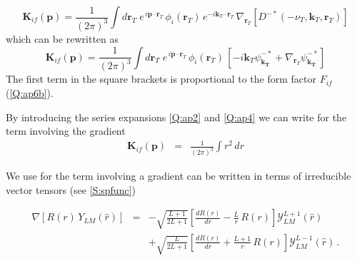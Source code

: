 \begin{equation}\label{Q:K_if-factor}
\bm{K}_{if}(\bm{p}) = \frac{1}{(2 \pi)^{3}} \int d \bm{r}_{T} \;
e^{\, i \bm{p} \cdot \bm{r}_{T}} \, \phi_{i}(\bm{r}_{T}) \,
e^{- i \bm{k}_{T} \cdot \bm{r}_{T}} \,\nabla_{\bm{r}_{T}} \left[
D^{-*}(-\nu_{T},\bm{k}_{T},\bm{r}_{T}) \right]
\end{equation}
which can be rewritten as
\begin{equation}\label{Q:Kfact1}
\bm{K}_{if}(\bm{p}) = \frac{1}{(2 \pi)^{3}} \int d \bm{r}_{T} \;
e^{\, i \bm{p} \cdot \bm{r}_{T}} \, \phi_{i}(\bm{r}_{T}) \,
\left[ -i \bm{k}_{T} \psi_{\bm{k_{T}}}^{-*} + \nabla_{\bm{r}_{T}}
\psi^{-*}_{\bm{k_{T}}} \right]
\end{equation}
The first term in the square brackets is proportional to the form
factor $F_{if}$ (\ref{Q:ap6b}).

By introducing the series expansions \ref{Q:ap2} and \ref{Q:ap4} we can
write for the term involving the gradient
\begin{eqnarray*}
\bm{K}_{if}(\bm{p}) &=& \frac{1}{(2 \pi)^{3}} \int r^{2} \, d r
\end{eqnarray*}


We use \cite[B.105]{Galindo1990_QMvI} for the term involving a gradient can be
written in terms of irreducible vector tensors (see \ref{S:spfunc})

\begin{eqnarray*}
\nabla \left[ R(r)\, Y_{LM}(\hat{r}) \right] &=& - \sqrt{\frac{L+1}{2L
+ 1}} \left[ \frac{d R (r)}{d r} - \frac{L}{r} \, R(r) \right]
\boldsymbol{\mathcal{Y}}^{L+1}_{LM}(\hat{r}) \nonumber \\
&&+ \sqrt{\frac{L}{2L + 1}} \left[ \frac{d R (r)}{d r} +
\frac{L+1}{r} \, R(r) \right]
\boldsymbol{\mathcal{Y}}^{L-1}_{LM}(\hat{r}) \, .
\end{eqnarray*}

